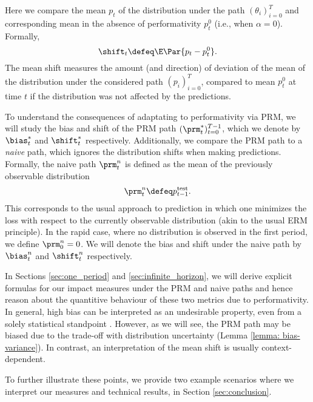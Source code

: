  Here we compare the mean $p_t$ of the distribution under the path $(\theta_i)_{i=0}^T$ and corresponding mean in the absence of
performativity $p^0_t$ (i.e., when $\alpha = 0$). Formally,
\begin{equation}
    \label{eqn:shift}
    \shift_t \defeq \E\Par{p_t - p^0_t}.
\end{equation}
The mean shift measures the amount (and direction) of deviation of the mean of the distribution under the considered path $(p_i)_{i=0}^T$, compared to mean $p^0_t$ at time $t$ if the distribution was not affected by the predictions.

 To understand the consequences of adaptating to performativity via PRM, we will study the bias and shift of the PRM path $(\prm^*_t)_{t=0}^{T-1}$, which we denote by $\bias^*_t$ and $\shift^*_t$ respectively. Additionally, we
compare the PRM path to a \emph{naive} path, which ignores the distribution
shifts when making predictions. Formally, the naive path $\prm^n_t$ is defined as the mean of the
previously observable distribution
\begin{equation}
    \label{eqn:naive_path}
    \prm^n_t \defeq p^\text{test}_{t-1}.
\end{equation}
This corresponds to the usual approach to prediction in which one minimizes the loss with respect to the currently observable distribution (akin to the usual ERM principle). In the rapid case, where no distribution is observed in the first period, we define $\prm^n_0 = 0$. We will denote the bias and shift under the naive path by $\bias^n_t$ and $\shift^n_t$ respectively. 

 In Sections \ref{sec:one_period} and \ref{sec:infinite_horizon}, we will derive explicit formulas for our impact measures under the PRM and naive paths and hence reason about the quantitive behaviour of these two metrics due to performativity. In general, high bias can be interpreted as an undesirable property, even from a solely statistical standpoint \cite{young2005essentials}. However, as we will see, the PRM path may be biased due to the trade-off with distribution uncertainty (Lemma \ref{lemma: bias-variance}). In contrast, an interpretation of the mean shift is usually context-dependent.

To further illustrate these points, we provide two example scenarios where we interpret our measures and technical results, in Section \ref{sec:conclusion}.
